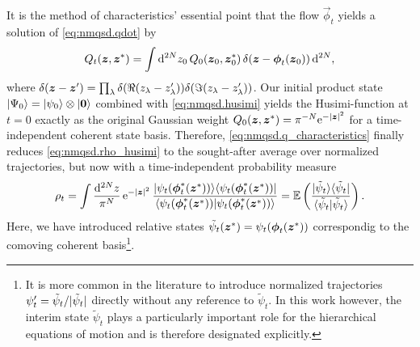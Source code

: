 It is the method of characteristics' essential point that the flow $\vec\phi_t$ yields a solution of \autoref{eq:nmqsd.qdot} by
\begin{equation}
  Q_t(\boldsymbol{z}, {\boldsymbol{z}}^*) = \int \mathrm{d}^{2N}z_0 \, Q_0(\boldsymbol{z}_0, {\boldsymbol{z}}^*_0) \, \delta(\boldsymbol{z} - \boldsymbol{\phi}_t(\boldsymbol{z}_0)) \, \mathrm{d}^{2N},
  \label{eq:nmqsd.q_characteristics}
\end{equation}
where $\delta(\boldsymbol{z} - \boldsymbol{z}') = \prod_\lambda \delta(\Re(z_\lambda - z_\lambda')) \delta(\Im(z_\lambda - z_\lambda'))$.
Our initial product state $| \Psi_0 \rangle = | \psi_0 \rangle \otimes | \boldsymbol{0} \rangle$ combined with \autoref{eq:nmqsd.husimi} yields the Husimi-function at $t=0$ exactly as the original Gaussian weight $Q_0(\zz, \cc\zz) = \pi^{-N} \exp[-\abs{\zz}^2]$ for a time-independent coherent state basis.
Therefore, \autoref{eq:nmqsd.q_characteristics} finally reduces \autoref{eq:nmqsd.rho_husimi} to the sought-after average over normalized trajectories, but now with a time-independent probability measure
\begin{equation}
  \rho_t = \int \frac{\mathrm{d}^{2N}z}{\pi^N} \, \exp[-\abs{\zz}^2] \, \frac{\ket\psitphi \bra\psitphi}{\braket{\psitphi}{\psitphi}}
         = \E[ \frac{\ket{\tilde\psi_t}\bra{\tilde\psi_t}}{\braket{\tilde\psi_t}{\tilde\psi_t}}].
  \label{eq:nmqsd.reduced_matrix_comoving}
\end{equation}
Here, we have introduced relative states $\tilde\psi_t({\boldsymbol{z}}^*) = \psi_t(\boldsymbol{\phi}_t({\boldsymbol{z}}^*))$ correspondig to the comoving coherent basis\footnote{%
  It is more common in the literature to introduce normalized trajectories $\psi'_t = \tilde\psi_t / \vert \tilde\psi_t \vert$ directly without any reference to $\tilde\psi_t$.
  In this work however, the interim state $\tilde\psi_t$ plays a particularly important role for the hierarchical equations of motion and is therefore designated explicitly.
}.\\



